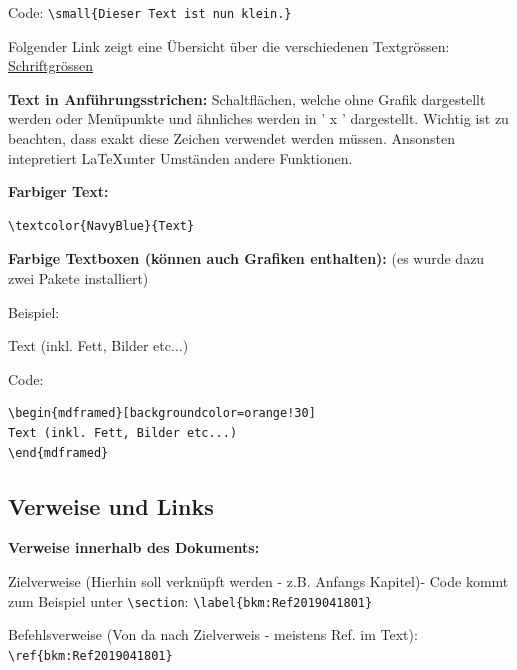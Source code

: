 \vspace{\baselineskip}

Code: \verb+\small{Dieser Text ist nun klein.}+

\vspace{\baselineskip}

Folgender Link zeigt eine Übersicht über die verschiedenen Textgrössen: \href{https://de.overleaf.com/learn/latex/Font_sizes,_families,_and_styles}{\color{blue} Schriftgrössen}  

\vspace{\baselineskip}

\textbf{Text in Anführungsstrichen:}
Schaltflächen, welche ohne Grafik dargestellt werden oder Menüpunkte und ähnliches werden in ' x ' dargestellt. Wichtig ist zu beachten, dass exakt diese Zeichen verwendet werden müssen. Ansonsten intepretiert \LaTeX \enspace unter Umständen andere Funktionen.

\vspace{\baselineskip}

\textbf{Farbiger Text:}

\begin{verbatim}
\textcolor{NavyBlue}{Text}
\end{verbatim}

\vspace{\baselineskip}

\textbf{Farbige Textboxen (können auch Grafiken enthalten):}
(es wurde dazu zwei Pakete installiert)

Beispiel:
\begin{mdframed}[backgroundcolor=orange!30] 
Text (inkl. Fett, Bilder etc...)
\end{mdframed}

Code:
\begin{verbatim}
\begin{mdframed}[backgroundcolor=orange!30] 
Text (inkl. Fett, Bilder etc...)
\end{mdframed}
\end{verbatim}




\subsection{Verweise und Links}

\textbf{Verweise innerhalb des Dokuments:}

\begin{compactitem}
	\item Zielverweise (Hierhin soll verknüpft werden - z.B. Anfangs Kapitel)- Code kommt zum Beispiel unter \verb+\section+: \verb+\label{bkm:Ref2019041801}+
	\item Befehlsverweise (Von da nach Zielverweis - meistens Ref. im Text): \verb+\ref{bkm:Ref2019041801}+
\end{compactitem}

